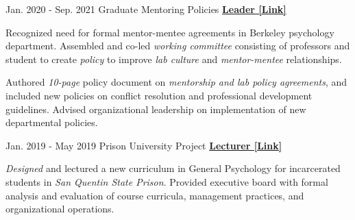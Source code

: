 


\begin{cventries}

  \cventry 
    {Jan. 2020 - Sep. 2021} %
    {Graduate Mentoring Policies}
    {\href{http://ivrylab.berkeley.edu/uploads/4/1/1/5/41152143/cognac_lab_policies_19feb2021.pdf}{\textbf{Leader [Link]}}} %
    {} %
    {
      \begin{cvitems} %
        \item {Recognized need for formal mentor-mentee agreements in Berkeley psychology department. Assembled and co-led \textit{working committee} consisting of professors and student to create \textit{policy} to improve \textit{lab culture} and \textit{mentor-mentee} relationships.}
        \item {Authored \textit{10-page} policy document on \textit{mentorship and lab policy agreements}, and included new policies on conflict resolution and professional development guidelines. Advised organizational leadership on implementation of new departmental policies.}
      \end{cvitems}
    }
    
  \cventry
    {Jan. 2019 - May 2019} %
    {Prison University Project}
    {\href{https://www.neh.gov/about/awards/national-humanities-medals/prison-university-project}{\textbf{Lecturer [Link]}}} %
    {} %
    {
      \begin{cvitems} %
        \item {\textit{Designed} and lectured a new curriculum in General Psychology for incarcerated students in \textit{San Quentin State Prison}. Provided executive board with formal analysis and evaluation of course curricula, management practices, and organizational operations.}
      \end{cvitems}
    }
    

\end{cventries}
